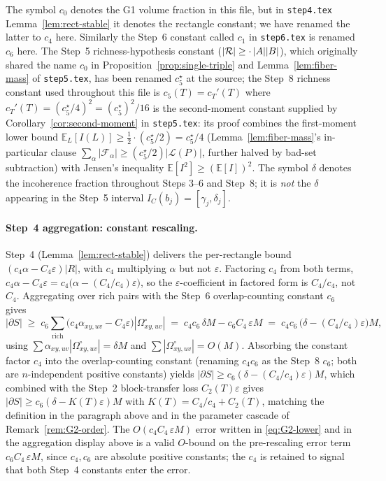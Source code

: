 \begin{remark}
The symbol $c_0$ denotes the G1 volume fraction in this file, but in
\texttt{step4.tex} Lemma~\ref{lem:rect-stable} it denotes the rectangle
constant; we have renamed the latter to $c_4$ here. Similarly the
Step~6 constant called $c_1$ in \texttt{step6.tex} is renamed $c_6$
here. The Step~5 richness-hypothesis constant ($|\mathcal{R}| \ge \cdot\,
|A||B|$), which originally shared the name $c_0$ in
Proposition~\ref{prop:single-triple} and Lemma~\ref{lem:fiber-mass}
of \texttt{step5.tex}, has been renamed $c_5^\star$ at the source;
the Step~8 richness constant used throughout this file is
$c_5(T) = c_T'(T)$ where $c_T'(T) = (c_5^\star/4)^2 = (c_5^\star)^2/16$
is the second-moment constant supplied by
Corollary~\ref{cor:second-moment} in \texttt{step5.tex}: its proof
combines the first-moment lower bound
$\mathbb E_L[I(L)]\ge \tfrac12 \cdot (c_5^\star/2) = c_5^\star/4$
(Lemma~\ref{lem:fiber-mass}'s in-particular clause
$\sum_\alpha|\mathcal F_\alpha|\ge(c_5^\star/2)|\mathcal L(P)|$,
further halved by bad-set subtraction) with Jensen's inequality
$\mathbb E[I^2]\ge(\mathbb E[I])^2$. The symbol $\delta$ denotes the incoherence
fraction throughout Steps 3--6 and Step~8; it is \emph{not} the
$\delta$ appearing in the Step~5 interval
$I_C(b_j) = [\gamma_j, \delta_j]$.
\end{remark}

\paragraph{Step~4 aggregation: constant rescaling.}
Step~4 (Lemma~\ref{lem:rect-stable}) delivers the per-rectangle bound $(c_4\alpha -
C_4\varepsilon)|R|$, with $c_4$ multiplying $\alpha$ but not
$\varepsilon$. Factoring $c_4$ from both terms,
$c_4\alpha - C_4\varepsilon = c_4\bigl(\alpha - (C_4/c_4)\varepsilon\bigr)$,
so the $\varepsilon$-coefficient in factored form is $C_4/c_4$, not
$C_4$. Aggregating over rich pairs with the Step~6 overlap-counting
constant $c_6$ gives
\[
 |\partial S| \;\ge\; c_6\sum_{\text{rich}}\bigl(c_4\alpha_{xy,uv} -
 C_4\varepsilon\bigr)|\Omega^\circ_{xy,uv}|
 \;=\; c_4 c_6\,\delta M - c_6 C_4\,\varepsilon M
 \;=\; c_4 c_6\,\bigl(\delta - (C_4/c_4)\varepsilon\bigr)M,
\]
using $\sum \alpha_{xy,uv}|\Omega^\circ_{xy,uv}| = \delta M$ and
$\sum|\Omega^\circ_{xy,uv}| = O(M)$. Absorbing the constant factor
$c_4$ into the overlap-counting constant (renaming $c_4 c_6$ as the
Step~8 $c_6$; both are $n$-independent positive constants) yields
$|\partial S|\ge c_6(\delta - (C_4/c_4)\varepsilon)M$, which combined
with the Step~2 block-transfer loss $C_2(T)\varepsilon$ gives
$|\partial S|\ge c_6(\delta - K(T)\varepsilon)M$ with
$K(T) = C_4/c_4 + C_2(T)$, matching the definition in the paragraph
above and in the parameter cascade of Remark~\ref{rem:G2-order}.
The $O(c_4 C_4\,\varepsilon
M)$ error written in \eqref{eq:G2-lower} and in the aggregation
display above is a valid $O$-bound on the pre-rescaling error term
$c_6 C_4\,\varepsilon M$, since $c_4, c_6$ are absolute positive
constants; the $c_4$ is retained to signal that both Step~4 constants
enter the error.

